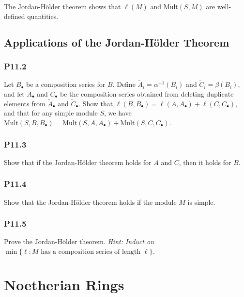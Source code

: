 \documentclass[lang=cn,11pt]{template}
\begin{document}
\begin{remark}
The Jordan-Hölder theorem shows that \( \ell(M) \) and \( \text{Mult}(S, M) \) are well-defined quantities.
\end{remark}

\section{Applications of the Jordan-Hölder Theorem}

\subsection*{P11.2} Let \( B_\bullet \) be a composition series for \( B \). Define \( \tilde{A}_i = \alpha^{-1}(B_i) \) and \( \tilde{C}_i = \beta(B_i) \), and let \( A_\bullet \) and \( C_\bullet \) be the composition series obtained from deleting duplicate elements from \( \tilde{A}_\bullet \) and \( \tilde{C}_\bullet \). Show that \( \ell(B, B_\bullet) = \ell(A, A_\bullet) + \ell(C, C_\bullet) \), and that for any simple module \( S \), we have \( \text{Mult}(S, B, B_\bullet) = \text{Mult}(S, A, A_\bullet) + \text{Mult}(S, C, C_\bullet) \).

\subsection*{P11.3} Show that if the Jordan-Hölder theorem holds for \( A \) and \( C \), then it holds for \( B \).

\subsection*{P11.4} Show that the Jordan-Hölder theorem holds if the module \( M \) is simple.

\subsection*{P11.5} Prove the Jordan-Hölder theorem. \textit{Hint: Induct on \( \min\{ \ell : M \text{ has a composition series of length } \ell \} \).}









\chapter{Noetherian Rings}
\end{document}
